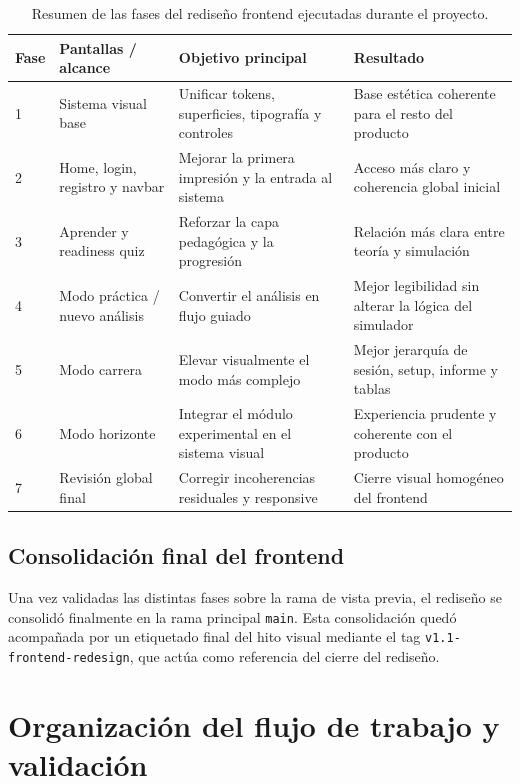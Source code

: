 \begin{table}[htbp]
\centering
\small
\renewcommand{\arraystretch}{1.2}
\begin{tabular}{|p{}|p{}|p{}|p{}|}
\hline
\textbf{Fase} & \textbf{Pantallas / alcance} & \textbf{Objetivo principal} & \textbf{Resultado} \\ \hline
1 & Sistema visual base & Unificar tokens, superficies, tipografía y controles & Base estética coherente para el resto del producto \\ \hline
2 & Home, login, registro y navbar & Mejorar la primera impresión y la entrada al sistema & Acceso más claro y coherencia global inicial \\ \hline
3 & Aprender y readiness quiz & Reforzar la capa pedagógica y la progresión & Relación más clara entre teoría y simulación \\ \hline
4 & Modo práctica / nuevo análisis & Convertir el análisis en flujo guiado & Mejor legibilidad sin alterar la lógica del simulador \\ \hline
5 & Modo carrera & Elevar visualmente el modo más complejo & Mejor jerarquía de sesión, setup, informe y tablas \\ \hline
6 & Modo horizonte & Integrar el módulo experimental en el sistema visual & Experiencia prudente y coherente con el producto \\ \hline
7 & Revisión global final & Corregir incoherencias residuales y responsive & Cierre visual homogéneo del frontend \\ \hline
\end{tabular}
\caption{Resumen de las fases del rediseño frontend ejecutadas durante el proyecto.}
\label{tab:rediseno_fases}
\end{table}

\subsection{Consolidación final del frontend}

Una vez validadas las distintas fases sobre la rama de vista previa, el rediseño se consolidó finalmente en la rama principal \texttt{main}. Esta consolidación quedó acompañada por un etiquetado final del hito visual mediante el tag \texttt{v1.1-frontend-redesign}, que actúa como referencia del cierre del rediseño.

\section{Organización del flujo de trabajo y validación}


